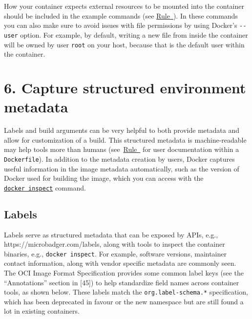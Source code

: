 \documentclass[10pt,letterpaper]{article}
\begin{document}
How your container expects external resources to be mounted into the
container should be included in the example commands (see
\hyperref[{rule:formatting}]{Rule~}). In
these commands you can also make sure to avoid issues with file
permissions by using Docker's \texttt{-\/-user} option. For example, by
default, writing a new file from inside the container will be owned by
user \texttt{root} on your host, because that is the default user within
the container.

\hypertarget{capture-structured-environment-metadata}{%
\section*{6. Capture structured environment
metadata}\label{capture-structured-environment-metadata}}

  \label{rule:metadata} 

Labels and build arguments can be very helpful to both provide metadata
and allow for customization of a build. This structured metadata is
machine-readable may help tools more than humans
(see~\hyperref[{rule:formatting}]{Rule~} for
user documentation within a \texttt{Dockerfile}). In addition to the
metadata creation by users, Docker captures useful information in the
image metadata automatically, such as the version of Docker used for
building the image, which you can access with the
\href{https://docs.docker.com/engine/reference/commandline/inspect/}{\texttt{docker\ inspect}}
command.

\hypertarget{labels}{%
\subsection{Labels}\label{labels}}

Labels serve as structured metadata that can be exposed by APIs, e.g.,
https://microbadger.com/labels, along with tools to inspect the
container binaries, e.g., \texttt{docker\ inspect}. For example,
software versions, maintainer contact information, along with vendor
specific metadata are commonly seen. The OCI Image Format Specification
provides some common label keys (see the ``Annotations'' section in
{[}45{]}) to help standardize field names across container tools, as
shown below. These labels match the \texttt{org.label-schema.*}
specification, which has been deprecated in favour or the new namespace
but are still found a lot in existing containers.
\end{document}
